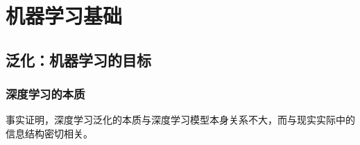 \chapter{机器学习基础\label{Ch05}}
\section{泛化：机器学习的目标}
\subsection{}
\subsection{深度学习的本质}
事实证明，深度学习泛化的本质与深度学习模型本身关系不大，而与现实实际中的信息结构密切相关。